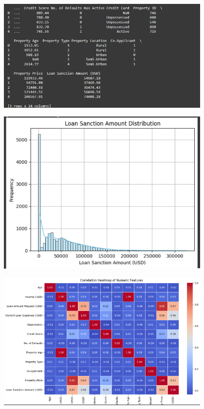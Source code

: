\documentclass[11pt]{article}
\begin{document}
\begin{center}
  \includegraphics[width=0.8\textwidth]{sc2.png}
\end{center}
\begin{center}
  \includegraphics[width=0.8\textwidth]{sc3.png}
\end{center}
\begin{center}
  \includegraphics[width=0.8\textwidth]{sc4.png}
\end{center}
\end{document}
